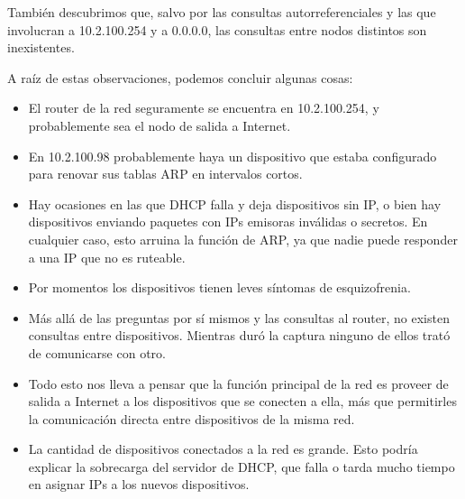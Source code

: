 También descubrimos que, salvo por las consultas autorreferenciales y las que
involucran a 10.2.100.254 y a 0.0.0.0, las consultas entre nodos distintos son
inexistentes.

A raíz de estas observaciones, podemos concluir algunas cosas:
\begin{itemize}
  \item El router de la red seguramente se encuentra en 10.2.100.254, y
probablemente sea el nodo de salida a Internet.
  \item En 10.2.100.98 probablemente haya un dispositivo que estaba configurado
para renovar sus tablas ARP en intervalos cortos.
  \item Hay ocasiones en las que DHCP falla y deja dispositivos sin IP, o bien
hay dispositivos enviando paquetes con IPs emisoras inválidas o secretos. En
cualquier caso, esto arruina la función de ARP, ya que nadie puede
responder a una IP que no es ruteable.
  \item Por momentos los dispositivos tienen leves síntomas de
esquizofrenia.
  \item Más allá de las preguntas por sí mismos y las consultas al router, no
existen consultas entre dispositivos. Mientras duró la captura ninguno de ellos
trató de comunicarse con otro.
  \item Todo esto nos lleva a pensar que la función principal de la red es
proveer de salida a Internet a los dispositivos que se conecten a ella, más que
permitirles la comunicación directa entre dispositivos de la misma red.
  \item La cantidad de dispositivos conectados a la red es grande.  Esto podría
explicar la sobrecarga del servidor de DHCP, que falla o tarda mucho tiempo en
asignar IPs a los nuevos dispositivos. 
\end{itemize}